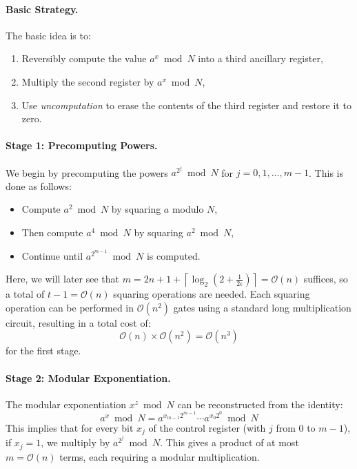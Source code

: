 \paragraph{Basic Strategy.} The basic idea is to:
\begin{enumerate}
    \item Reversibly compute the value $a^x \bmod N$ into a third ancillary register,
    \item Multiply the second register by $a^x \bmod N$,
    \item Use \emph{uncomputation} to erase the contents of the third register and restore it to zero.
\end{enumerate}

\paragraph{Stage 1: Precomputing Powers.}  
We begin by precomputing the powers $a^{2^j} \bmod N$ for $j = 0,1,\ldots,m-1$. This is done as follows:
\begin{itemize}
    \item Compute $a^2 \bmod N$ by squaring $a$ modulo $N$,
    \item Then compute $a^4 \bmod N$ by squaring $a^2 \bmod N$,
    \item Continue until $a^{2^{m-1}} \bmod N$ is computed.
\end{itemize}

Here, we will later see that $m = 2n + 1 + \left\lceil \log_2\left(2 + \frac{1}{2\epsilon} \right) \right\rceil = \mathcal{O}(n)$ suffices, so a total of $t-1 = \mathcal{O}(n)$ squaring operations are needed. Each squaring operation can be performed in $\mathcal{O}(n^2)$ gates using a standard long multiplication circuit, resulting in a total cost of:
\[
\mathcal{O}(n) \times \mathcal{O}(n^2) = \mathcal{O}(n^3)
\]
for the first stage.

\paragraph{Stage 2: Modular Exponentiation.}

The modular exponentiation $x^z \bmod N$ can be reconstructed from the identity:
\[
a^x \bmod N = a^{x_{m-1} 2^{m-1}} \cdots a^{x_0 2^0} \bmod N
\]
This implies that for every bit $x_j$ of the control register (with $j$ from $0$ to $m-1$), if $x_j = 1$, we multiply by $a^{2^j} \bmod N$. This gives a product of at most $m = \mathcal{O}(n)$ terms, each requiring a modular multiplication.

